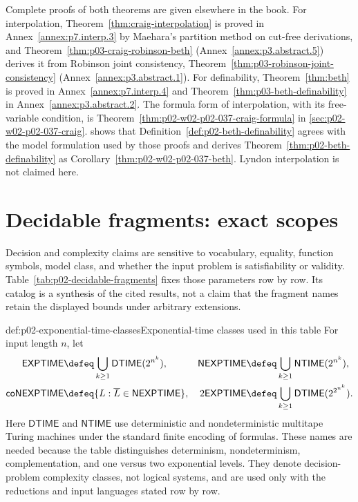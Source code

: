 Complete proofs of both theorems are given elsewhere in the book.  For
interpolation, Theorem~\ref{thm:craig-interpolation} is proved in
Annex~\ref{annex:p7.interp.3} by Maehara's partition method on cut-free
derivations, and Theorem~\ref{thm:p03-craig-robinson-beth}
(Annex~\ref{annex:p3.abstract.5}) derives it from Robinson joint consistency,
Theorem~\ref{thm:p03-robinson-joint-consistency}
(Annex~\ref{annex:p3.abstract.1}).  For definability,
Theorem~\ref{thm:beth} is proved in Annex~\ref{annex:p7.interp.4} and
Theorem~\ref{thm:p03-beth-definability} in Annex~\ref{annex:p3.abstract.2}.
The formula form of interpolation, with its free-variable condition, is
Theorem~\ref{thm:p02-w02-p02-037-craig-formula} in
\cref{sec:p02-w02-p02-037-craig}.   shows
that Definition~\ref{def:p02-beth-definability} agrees with the model
formulation used by those proofs and derives
Theorem~\ref{thm:p02-beth-definability} as
Corollary~\ref{thm:p02-w02-p02-037-beth}.  Lyndon interpolation is not
claimed here.

\section{Decidable fragments: exact scopes}
\label{sec:p02-decidable-fragments}

Decision and complexity claims are sensitive to vocabulary, equality,
function symbols, model class, and whether the input problem is satisfiability
or validity.  Table~\ref{tab:p02-decidable-fragments} fixes those parameters
row by row.  Its catalog is a synthesis of the cited results, not a claim that
the fragment names retain the displayed bounds under arbitrary extensions.

\begin{hbdefinition}{def:p02-exponential-time-classes}{Exponential-time classes used in this table}
For input length \(n\), let
\[
\begin{aligned}
 \mathsf{EXPTIME}&\defeq\bigcup_{k\geq1}\mathsf{DTIME}(2^{n^k}),&
 \mathsf{NEXPTIME}&\defeq\bigcup_{k\geq1}\mathsf{NTIME}(2^{n^k}),\\
 \mathsf{coNEXPTIME}&\defeq
   \{L:\overline L\in\mathsf{NEXPTIME}\},&
 2\mathsf{EXPTIME}&\defeq
   \bigcup_{k\geq1}\mathsf{DTIME}(2^{2^{n^k}}).
\end{aligned}
\]
Here \(\mathsf{DTIME}\) and \(\mathsf{NTIME}\) use deterministic and
nondeterministic multitape Turing machines under the standard finite encoding
of formulas.  These names are needed because the table distinguishes
determinism, nondeterminism, complementation, and one versus two exponential
levels.  They denote decision-problem complexity classes, not logical systems,
and are used only with the reductions and input languages stated row by row.
\end{hbdefinition}


